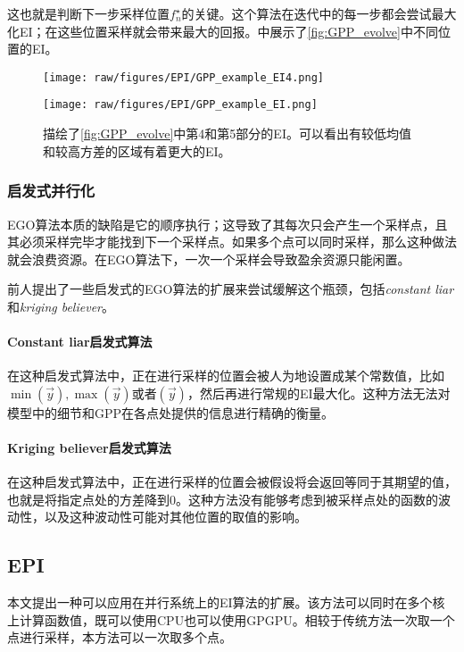 \documentclass[index]{subfiles}
\begin{document}
这也就是判断下一步采样位置$f_{n}^{\star}$的关键。这个算法在迭代中的每一步都会尝试最大化EI；在这些位置采样就会带来最大的回报。中展示了\cref{fig:GPP_evolve}中不同位置的EI。

\begin{figure}[hpt]
 	\centerline{\texttt{[image: raw/figures/EPI/GPP\_example\_EI4.png]}}
    \centerline{\texttt{[image: raw/figures/EPI/GPP\_example\_EI.png]}}
    \caption[GPP的EI的演变]{描绘了\cref{fig:GPP_evolve}中第4和第5部分的EI。可以看出有较低均值和较高方差的区域有着更大的EI。}
 	\label{fig:GPP_EI_evolve}
\end{figure}

\subsubsection{启发式并行化}

EGO算法本质的缺陷是它的顺序执行；这导致了其每次只会产生一个采样点，且其必须采样完毕才能找到下一个采样点。如果多个点可以同时采样，那么这种做法就会浪费资源。在EGO算法下，一次一个采样会导致盈余资源只能闲置。

前人提出了一些启发式的EGO算法的扩展来尝试缓解这个瓶颈，包括{\it constant liar}和{\it kriging believer}\cite{Ginsbourger2008}。

\paragraph{Constant liar启发式算法}

在这种启发式算法中，正在进行采样的位置会被人为地设置成某个常数值，比如$\min(\vec{y}), \max(\vec{y})$或者$(\vec{y})$，然后再进行常规的EI最大化。这种方法无法对模型中的细节和GPP在各点处提供的信息进行精确的衡量。

\paragraph{Kriging believer启发式算法}

在这种启发式算法中，正在进行采样的位置会被假设将会返回等同于其期望的值，也就是将指定点处的方差降到0。这种方法没有能够考虑到被采样点处的函数的波动性，以及这种波动性可能对其他位置的取值的影响。

\subsection{EPI}

本文提出一种可以应用在并行系统上的EI算法的扩展。该方法可以同时在多个核上计算函数值，既可以使用CPU也可以使用GPGPU。相较于传统方法一次取一个点进行采样，本方法可以一次取多个点。
\end{document}
